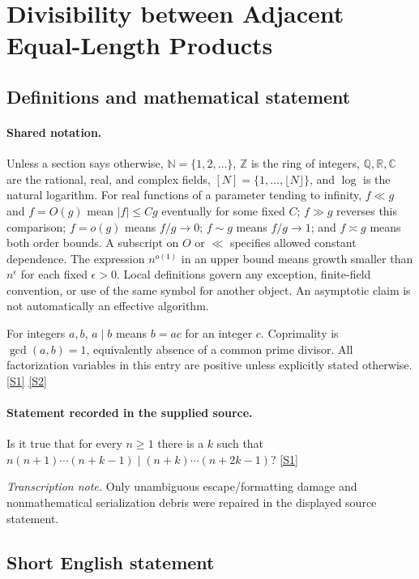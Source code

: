 \documentclass[11pt,a4paper]{article}
\newcommand{\N}{\mathbb{N}}
\newcommand{\Z}{\mathbb{Z}}
\newcommand{\Q}{\mathbb{Q}}
\newcommand{\R}{\mathbb{R}}
\newcommand{\C}{\mathbb{C}}
\newcommand{\sref}[2]{\hyperlink{source:#1:#2}{[S#2]}}
\begin{document}
\section{Divisibility between Adjacent Equal-Length Products}\label{statement}


\subsection{Definitions and mathematical statement}

\paragraph{Shared notation.}Unless a section says otherwise, $\N=\{1,2,\ldots\}$,
$\Z$ is the ring of integers, $\Q,\R,\C$ are the rational, real, and complex
fields, $[N]=\{1,\ldots,\lfloor N\rfloor\}$, and $\log$ is the natural
logarithm. For real functions of a parameter tending to infinity,
$f\ll g$ and $f=O(g)$ mean $|f|\leq Cg$ eventually for some fixed $C$;
$f\gg g$ reverses this comparison; $f=o(g)$ means $f/g\to0$;
$f\sim g$ means $f/g\to1$; and $f\asymp g$ means both order bounds.
A subscript on $O$ or $\ll$ specifies allowed constant dependence.
The expression $n^{o(1)}$ in an upper bound means growth smaller than
$n^\epsilon$ for each fixed $\epsilon>0$. Local definitions govern any
exception, finite-field convention, or use of the same symbol for another
object. An asymptotic claim is not automatically an effective algorithm.



For integers $a,b$, $a\mid b$ means $b=ac$ for an integer $c$. Coprimality is $\gcd(a,b)=1$, equivalently absence of a common prime divisor. All factorization variables in this entry are positive unless explicitly stated otherwise. \sref{statement}{1} \sref{statement}{2}

\paragraph{Statement recorded in the supplied source.}
Is it true that for every $n\geq 1$ there is a $k$ such that $ n(n+1)\cdots(n+k-1)\mid (n+k)\cdots (n+2k-1)? $ \sref{statement}{1}

{\small\emph{Transcription note.} Only unambiguous escape/formatting damage and nonmathematical serialization debris were repaired in the displayed source statement.}

\subsection{Short English statement}
\end{document}
